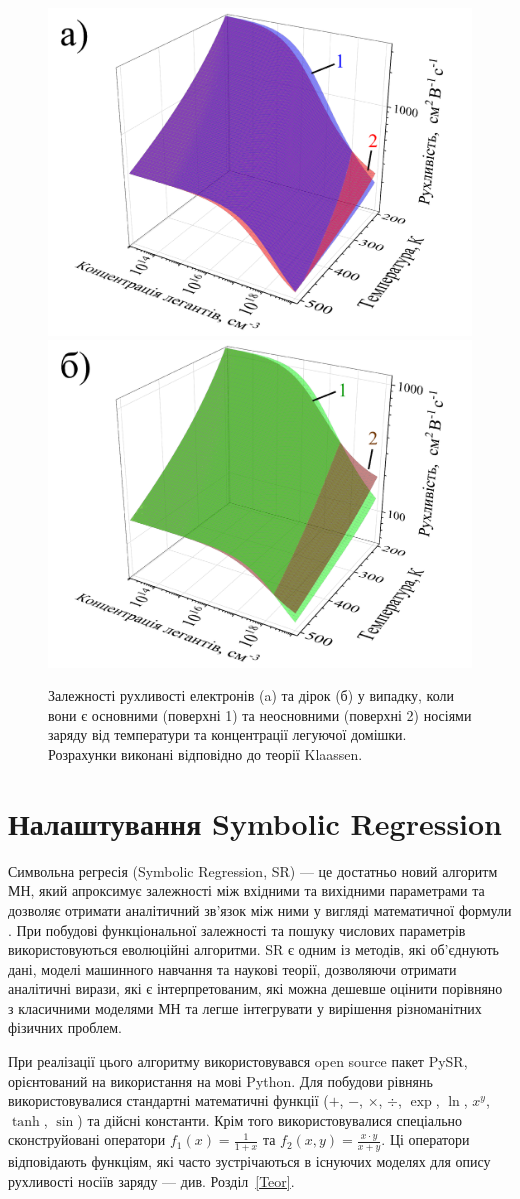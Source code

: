 \documentclass[10pt,a5paper,titlepage,oneside]{book}
\numberwithin{equation}{part}
\begin{document}
\begin{figure}
	\centering
     \includegraphics[width=0.49\linewidth]{Fig21a.png}
     \includegraphics[width=0.49\linewidth]{Fig21b.png}
	  \caption{Залежності рухливості електронів (a) та дірок (б) у випадку, коли вони є основними (поверхні 1) та неосновними (поверхні 2)
носіями заряду від температури та концентрації легуючої домішки. Розрахунки виконані відповідно до теорії Klaassen.
}\label{figMuKl}
\end{figure}

\section{Налаштування Symbolic Regression}

Символьна регресія (Symbolic Regression, SR) --- це достатньо новий алгоритм МН, який апроксимує
залежності між вхідними та вихідними параметрами та дозволяє отримати аналітичний зв'язок між ними у вигляді математичної формули \cite{Angelis2023}.
При побудові функціональної залежності та пошуку числових параметрів використовуються еволюційні алгоритми.
SR є одним із методів, які об'єднують дані, моделі машинного навчання та наукові теорії, дозволяючи отримати аналітичні вирази,
які є інтерпретованим, які можна дешевше оцінити порівняно з класичними моделями МН та легше інтегрувати у вирішення різноманітних фізичних проблем.

При реалізації цього алгоритму використовувався open source пакет PySR, орієнтований на використання на мові Python.
Для побудови рівнянь використовувалися стандартні математичні функції
($+$, $-$, $\times$, $\div$, $\exp$, $\ln$, $x^y$, $\tanh$, $\sin$) та дійсні константи.
Крім того використовувалися спеціально сконструйовані оператори
$f_1(x)=\frac{1}{1+x}$ та $f_2(x,y)=\frac{x\cdot y}{x+y}$.
Ці оператори відповідають функціям, які часто зустрічаються в існуючих моделях для опису рухливості носіїв заряду --- див. Розділ~\ref{Teor}. 
\end{document}
